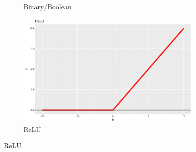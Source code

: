 \documentclass[preprint,5p,compress]{elsarticle}
\begin{document}
\begin{figure}[htp!]
\begin{subfigure}[t]{0.3\textwidth}
		\caption{Binary/Boolean} \label{Fig.Binary}
	\end{subfigure}
	\begin{subfigure}[t]{0.3\textwidth}
		\centering
		\includegraphics[width=\linewidth]{ReLU.pdf} 
		\caption{ReLU} \label{Fig.ReLU}
	\end{subfigure}
	

\end{figure}
\end{document}
